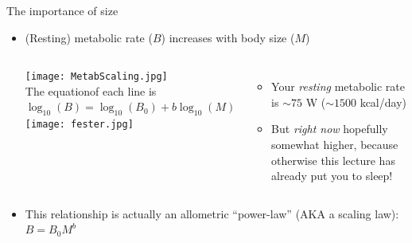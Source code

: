 \begin{frame}{The importance of size}

  \begin{itemize}[<+->]\itemsep12pt
    \item (Resting) metabolic rate ($B$) increases with body size ($M$) 
    \vspace{6pt}
    \begin{columns}[c]
	    \centering
        \texttt{[image: MetabScaling.jpg]}\\ 
	      \pause \onslide<4-> The equation\footnotemark of each line is $\log_{10}(B) = \log_{10}(B_0) +  b \log_{10}(M)$
	    \centering
	      \texttt{[image: fester.jpg]}
	      \begin{itemize}\itemsep0pt
          \item Your {\it resting} metabolic rate is $\sim75$ W ($\sim1500$ kcal/day)
          \item But {\it right now} hopefully somewhat higher, because otherwise this lecture has already put you to sleep!
	      \end{itemize}
    \end{columns}
    \item This relationship is actually an allometric ``power-law'' (AKA a scaling law)\footnotemark[1]: $B = B_0 M^b$
  \end{itemize}


\end{frame}

